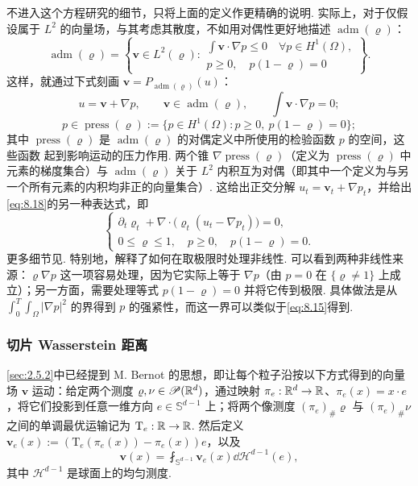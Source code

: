 不进入这个方程研究的细节，只将上面的定义作更精确的说明. 实际上，对于仅假设属于 $L^2$ 的向量场，与其考虑其散度，不如用对偶性更好地描述 $\operatorname{adm}(\varrho)$：
\[
\operatorname{adm}(\varrho)=\left\{\mathbf v\in L^2(\varrho):
\begin{array}{l}
\displaystyle\int\mathbf v\cdot\nabla p\leq0\quad\forall p\in H^1(\Omega),\\
p\geq0,\quad p(1-\varrho)=0
\end{array}\right\}.
\]
这样，就通过下式刻画 $\mathbf v=P_{\operatorname{adm}(\varrho)}(u)$：
\[
u=\mathbf v+\nabla p,\qquad\mathbf v\in\operatorname{adm}(\varrho),\qquad\int\mathbf v\cdot\nabla p=0;
\]
\[
p\in\operatorname{press}(\varrho):=\{p\in H^1(\Omega):p\geq0,\ p(1-\varrho)=0\};
\]
其中 $\operatorname{press}(\varrho)$ 是 $\operatorname{adm}(\varrho)$ 的对偶定义中所使用的检验函数 $p$ 的空间，这些函数\label{idx:i118-p310}
起到影响运动的压力作用. 两个锥 $\nabla\operatorname{press}(\varrho)$（定义为 $\operatorname{press}(\varrho)$ 中元素的梯度集合）与 $\operatorname{adm}(\varrho)$ 关于 $L^2$ 内积互为对偶（即其中一个定义为与另一个所有元素的内积均非正的向量集合）. 这给出正交分解 $u_t=\mathbf v_t+\nabla p_t$，并给出\eqref{eq:8.18}的另一种表达式，即
\begin{equation}\label{eq:8.19}
\begin{cases}
\partial_t\varrho_t+\nabla\cdot\bigl(\varrho_t(u_t-\nabla p_t)\bigr)=0,\\
0\leq\varrho\leq1,\quad p\geq0,\quad p(1-\varrho)=0.
\end{cases}
\end{equation}
更多细节见\cite{b225,b226,b265}. 特别地，\cite{b225}解释了如何在取极限时处理非线性. 可以看到两种非线性来源：$\varrho\nabla p$ 这一项容易处理，因为它实际上等于 $\nabla p$（由 $p=0$ 在 $\{\varrho\neq1\}$ 上成立）；另一方面，需要处理等式 $p(1-\varrho)=0$ 并将它传到极限. 具体做法是从 $\int_0^T\int_\Omega|\nabla p|^2$ 的界得到 $p$ 的强紧性，而这一界可以类似于\eqref{eq:8.15}得到.

\label{idx:i140-p310}
\subsubsection*{切片 Wasserstein 距离}
\autoref{sec:2.5.2}中已经提到 M. Bernot 的思想，即让每个粒子沿按以下方式得到的向量场 $\mathbf v$ 运动：给定两个测度 $\varrho,\nu\in\mathscr P(\mathbb R^d)$，通过映射 $\pi_e:\mathbb R^d\to\mathbb R$、$\pi_e(x)=x\cdot e$，将它们投影到任意一维方向 $e\in\mathbb S^{d-1}$ 上；将两个像测度 $(\pi_e)_\#\varrho$ 与 $(\pi_e)_\#\nu$ 之间的单调最优运输记为 $\mathrm T_e:\mathbb R\to\mathbb R$. 然后定义 $\mathbf v_e(x):=(\mathrm T_e(\pi_e(x))-\pi_e(x))e$，以及
\[
\mathbf v(x)=\fint_{\mathbb S^{d-1}}\mathbf v_e(x)\dd\mathscr H^{d-1}(e),
\]
其中 $\mathscr H^{d-1}$ 是球面上的均匀测度.

